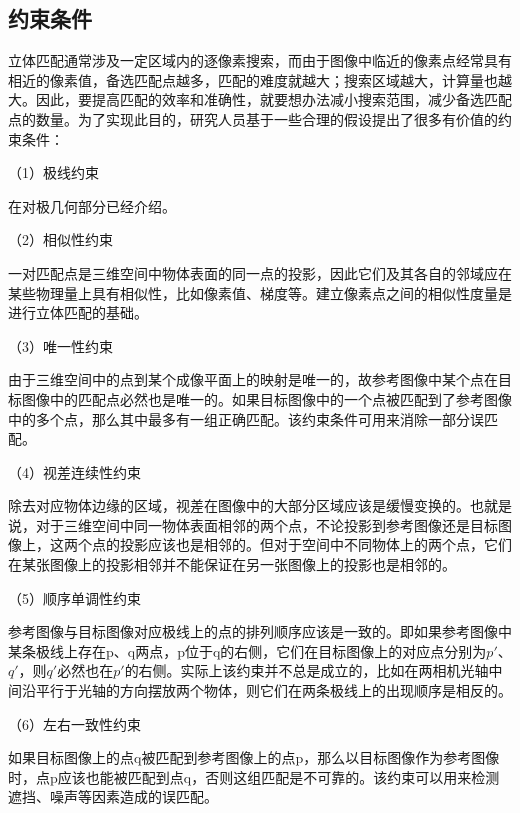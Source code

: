 \subsection{约束条件}
立体匹配通常涉及一定区域内的逐像素搜索，而由于图像中临近的像素点经常具有相近的像素值，备选匹配点越多，匹配的难度就越大；搜索区域越大，计算量也越大。因此，要提高匹配的效率和准确性，就要想办法减小搜索范围，减少备选匹配点的数量。为了实现此目的，研究人员基于一些合理的假设提出了很多有价值的约束条件\cite{陈拓2017CCNN}：

（1）极线约束

在对极几何部分已经介绍。

（2）相似性约束

一对匹配点是三维空间中物体表面的同一点的投影，因此它们及其各自的邻域应在某些物理量上具有相似性，比如像素值、梯度等。建立像素点之间的相似性度量是进行立体匹配的基础。

（3）唯一性约束

由于三维空间中的点到某个成像平面上的映射是唯一的，故参考图像中某个点在目标图像中的匹配点必然也是唯一的。如果目标图像中的一个点被匹配到了参考图像中的多个点，那么其中最多有一组正确匹配。该约束条件可用来消除一部分误匹配。

（4）视差连续性约束

除去对应物体边缘的区域，视差在图像中的大部分区域应该是缓慢变换的。也就是说，对于三维空间中同一物体表面相邻的两个点，不论投影到参考图像还是目标图像上，这两个点的投影应该也是相邻的。但对于空间中不同物体上的两个点，它们在某张图像上的投影相邻并不能保证在另一张图像上的投影也是相邻的。

（5）顺序单调性约束

参考图像与目标图像对应极线上的点的排列顺序应该是一致的。即如果参考图像中某条极线上存在p、q两点，p位于q的右侧，它们在目标图像上的对应点分别为$p'$、$q'$，则$q'$必然也在$p'$的右侧。实际上该约束并不总是成立的，比如在两相机光轴中间沿平行于光轴的方向摆放两个物体，则它们在两条极线上的出现顺序是相反的。

（6）左右一致性约束

如果目标图像上的点q被匹配到参考图像上的点p，那么以目标图像作为参考图像时，点p应该也能被匹配到点q，否则这组匹配是不可靠的。该约束可以用来检测遮挡、噪声等因素造成的误匹配。


